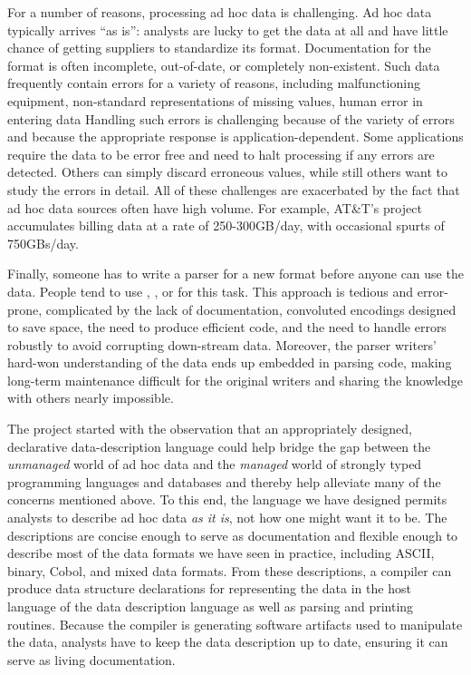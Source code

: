 \documentclass{sig-alternate}
\begin{document}
For a number of reasons, processing ad hoc data is challenging.  Ad
hoc data typically arrives ``as is'': analysts are lucky to get the
data at all and have little chance of getting suppliers to standardize
its format.  Documentation for the format is often incomplete,
out-of-date, or completely non-existent.  Such data frequently contain
errors for a variety of reasons, including malfunctioning equipment,
non-standard representations of missing values, human error in
entering data \etc{}  Handling such errors is challenging because of
the variety of errors and because the appropriate response is 
application-dependent. Some applications require the data to be error
free and need to halt processing if any errors are detected.  Others
can simply discard erroneous values, while still others want to study
the errors in detail.  All of these challenges are exacerbated by the
fact that ad hoc data sources often have high volume.  For example, 
AT\&T's \ningaui{} project accumulates billing data at a rate
of 250-300GB/day, with occasional spurts of 750GBs/day.

Finally, someone has to write a parser for a new format before anyone
can use the data. People tend to use \C{}, \perl{}, or \python{} for
this task.  This approach is tedious and error-prone, complicated by
the lack of documentation, convoluted encodings designed to save
space, the need to produce efficient code, and the need to handle
errors robustly to avoid corrupting down-stream data.  Moreover, the
parser writers' hard-won understanding of the data ends up embedded in
parsing code, making long-term maintenance difficult for the original
writers and sharing the knowledge with others nearly impossible.

The \pads{} project started with the observation that an appropriately
designed, declarative data-description language could 
help bridge the gap
between the {\em unmanaged} world of ad hoc data and the {\em managed} world
of strongly typed programming languages and databases and thereby
help alleviate many of the concerns mentioned above.  To this end,
the language we have designed permits analysts to describe ad hoc 
data \textit{as it is}, not
how one might want it to be. The descriptions are concise enough to
serve as documentation and flexible enough to describe most of the
data formats we have seen in practice, including ASCII, binary, Cobol,
and mixed data formats.  From these descriptions, a compiler can
produce data structure declarations for representing the data in the
host language of the data description language as well as parsing and
printing routines.  Because the compiler is generating software
artifacts used to manipulate the data, analysts have to keep the data
description up to date, ensuring it can serve as living documentation.
\end{document}

